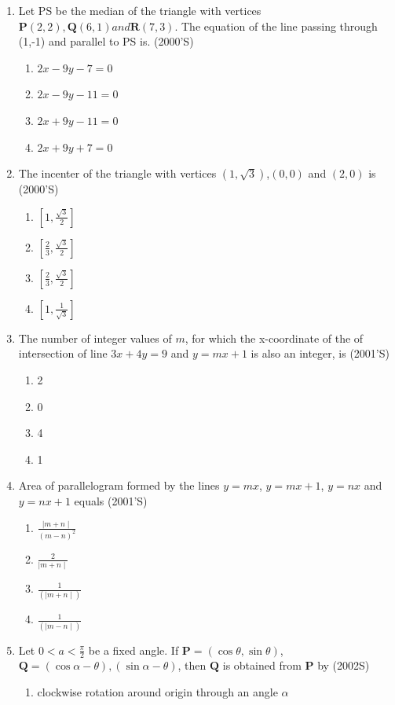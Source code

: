 \documentclass[12pt]{article}
\providecommand{\sbrak}[1]{\ensuremath{{}\left[#1\right]}}
\let\vec\mathbf
\begin{document}
\begin{enumerate}
\begin{enumerate}
\end{enumerate}
\item Let PS be the median of the triangle with vertices $\vec{P}(2,2), \vec{Q}(6,1) and \vec{R}(7,3)$. The equation of the line passing through (1,-1) and parallel to PS is. (2000'S)
\begin{enumerate}
\item $2x-9y-7=0$ 
\item $2x-9y-11=0$ 
\item $2x+9y-11=0$
\item $2x+9y+7=0$
\end{enumerate}
\item The incenter of the triangle with vertices $(1,\sqrt{3})$,$(0,0)$ and $(2,0)$ is (2000'S)
\begin{enumerate}
\item $\sbrak{1,\frac{\sqrt{3}}{2}}$ 
\item $\sbrak{\frac{2}{3},\frac{\sqrt{3}}{2}}$ 
\item $\sbrak{\frac{2}{3},\frac{\sqrt{3}}{2}}$ 
\item $\sbrak{1,\frac{1}{{\sqrt{3}}}}$
\end{enumerate}
\item The number of integer values of $m$, for which the x-coordinate of the of intersection of line $3x+4y=9$ and $y=mx+1$ is also an integer, is (2001'S)
\begin{enumerate}
\item 2 
\item 0 
\item 4   
\item 1
\end{enumerate}
\item Area of parallelogram formed by the lines $y=mx$, $y=mx+1$, $y=nx$ and $y=nx+1$ equals (2001'S)
\begin{enumerate}
\item $\frac{\mid m+n\mid}{(m-n)^2}$
\item $\frac{2}{\mid m+n \mid}$
\item $\frac{1}{(\mid m+n \mid)}$
\item $\frac{1}{(\mid m-n\mid)}$
\end{enumerate}
\item Let $0<a<\frac{\pi}{2}$ be a fixed angle. If $\vec{P}=(\cos\theta,\sin\theta)$, $\vec{Q}=(\cos\alpha-\theta),(\sin\alpha-\theta)$, then $\vec{Q}$ is obtained from $\vec{P}$ by (2002S)
\begin{enumerate}
\item clockwise rotation around origin through an angle $\alpha$

\end{enumerate}
\end{enumerate}
\end{document}
